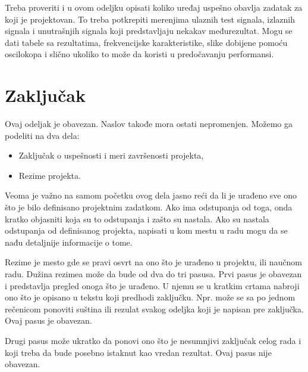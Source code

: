 \documentclass[a4paper, 12pt]{article}
\begin{document}
\vspace{10pt}

Treba proveriti i u ovom odeljku opisati koliko uređaj uspešno obavlja zadatak za koji je projektovan. To treba potkrepiti merenjima ulaznih test signala, izlaznih signala i unutrašnjih signala koji predstavljaju nekakav međurezultat. Mogu se dati tabele sa rezultatima, frekvencijske karakteristike, slike dobijene pomoću oscilokopa i slično ukoliko to može da koristi u predočavanju performansi.
\pagebreak

\section{Zaključak}

\vspace{10pt}


Ovaj odeljak je obavezan. Naslov takođe mora ostati nepromenjen. Možemo ga podeliti na dva dela:

\begin{itemize}
	\item Zaključak o uspešnosti i meri završenosti projekta,
	\item Rezime projekta.
\end{itemize}

\vspace{10pt}

Veoma je važno na samom početku ovog dela jasno reći da li je urađeno sve ono što je bilo definisano projektnim zadatkom. Ako ima odstupanja od toga, onda kratko objasniti koja su to odstupanja i zašto su nastala. Ako su nastala odstupanja od definisanog projekta, napisati u kom mestu u radu mogu da se nađu detaljnije informacije o tome.

\vspace{10pt}

Rezime je mesto gde se pravi osvrt na ono što je urađeno u projektu, ili naučnom radu. Dužina rezimea može da bude od dva do tri pasusa. Prvi pasus je obavezan i predstavlja pregled onoga što je urađeno. U njemu se u kratkim crtama nabroji ono što je opisano u tekstu koji predhodi zaključku. Npr. može se sa po jednom rečenicom ponoviti suština ili rezulat svakog odeljka koji je napisan pre zaključka. Ovaj pasus je obavezan.

\vspace{10pt}

Drugi pasus može ukratko da ponovi ono što je nesumnjivi zaključak celog rada i koji treba da bude posebno istaknut kao vredan rezultat. Ovaj pasus nije obavezan.
\end{document}
